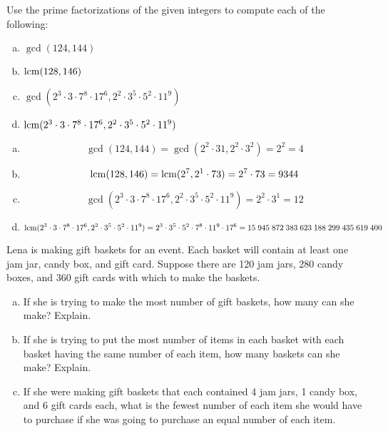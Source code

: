 \documentclass[11pt,letterpaper]{article}
\begin{document}
 Use the prime factorizations of the given integers to compute each of the following:
\begin{enumerate}[(a)]
\item $\gcd(124, 144)$
\item $\operatorname{lcm}(128, 146)$
\item $\gcd(2^3 \cdot 3 \cdot 7^8 \cdot 17^6, 2^2 \cdot 3^5 \cdot 5^2 \cdot 11^9)$
\item $\operatorname{lcm}(2^3 \cdot 3 \cdot 7^8 \cdot 17^6, 2^2 \cdot 3^5 \cdot 5^2 \cdot 11^9)$
\end{enumerate} \pspace

\begin{enumerate}[(a)]
\item 
	\[
	\gcd(124, 144)= \gcd(2^2 \cdot 31, 2^2 \cdot 3^2)= 2^2= 4
	\]

\item 
	\[
	\operatorname{lcm}(128, 146)= \operatorname{lcm}(2^7, 2^1 \cdot 73)= 2^7 \cdot 73= 9344
	\]

\item 
	\[
	\gcd(2^3 \cdot 3 \cdot 7^8 \cdot 17^6, 2^2 \cdot 3^5 \cdot 5^2 \cdot 11^9)= 2^2 \cdot 3^1= 12 
	\]

\item 
	\[
	\operatorname{lcm}(2^3 \cdot 3 \cdot 7^8 \cdot 17^6, 2^2 \cdot 3^5 \cdot 5^2 \cdot 11^9)= 2^3 \cdot 3^5 \cdot 5^2 \cdot 7^8 \cdot 11^9 \cdot 17^6= 15\;945\;872\;383\;623\;188\;299\;435\;619\;400
	\]
\end{enumerate}



\newpage



 Lena is making gift baskets for an event. Each basket will contain at least one jam jar, candy box, and gift card. Suppose there are 120 jam jars, 280 candy boxes, and 360 gift cards with which to make the baskets. 
\begin{enumerate}[(a)]
\item If she is trying to make the most number of gift baskets, how many can she make? Explain. 
\item If she is trying to put the most number of items in each basket with each basket having the same number of each item, how many baskets can she make? Explain. 
\item If she were making gift baskets that each contained 4 jam jars, 1 candy box, and 6 gift cards each, what is the fewest number of each item she would have to purchase if she was going to purchase an equal number of each item.
\end{enumerate} \pspace
\end{document}
